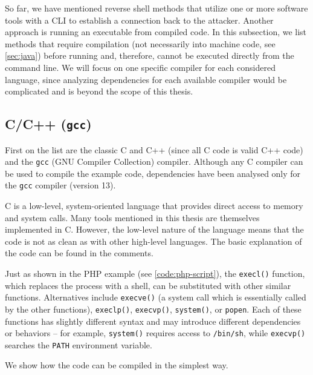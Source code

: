 So far, we have mentioned reverse shell methods that utilize one or more software tools with a CLI to establish a connection back to the attacker. Another approach is running an executable from compiled code. In this subsection, we list methods that require compilation (not necessarily into machine code, see \cref{sec:java}) before running and, therefore, cannot be executed directly from the command line. We will focus on one specific compiler for each considered language, since analyzing dependencies for each available compiler would be complicated and is beyond the scope of this thesis.

\subsection{C/C++ (\texttt{gcc})}
\label{sec:gcc}


First on the list are the classic C and C++ (since all C code is valid C++ code) and the \texttt{gcc} (GNU Compiler Collection) compiler. Although any C compiler can be used to compile the example code, dependencies have been analysed only for the \texttt{gcc} compiler (version 13).

C is a low-level, system-oriented language that provides direct access to memory and system calls. Many tools mentioned in this thesis are themselves implemented in C. However, the low-level nature of the language means that the code is not as clean as with other high-level languages. The basic explanation of the code can be found in the comments.


Just as shown in the PHP example (see \cref{code:php-script}), the \texttt{execl()} function, which replaces the process with a shell, can be substituted with other similar functions. Alternatives include \texttt{execve()} (a system call which is essentially called by the other functions), \texttt{execlp()}, \texttt{execvp()}, \texttt{system()}, or \texttt{popen}. Each of these functions has slightly different syntax and may introduce different dependencies or behaviors -- for example, \texttt{system()} requires access to \texttt{/bin/sh}, while \texttt{execvp()} searches the \texttt{PATH} environment variable.

We show how the code can be compiled in the simplest way.


